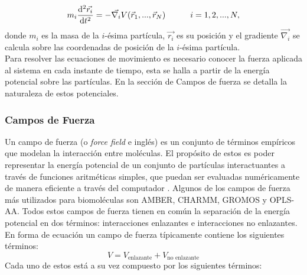 \begin{equation}\label{eq:1}
m_i\frac{\mathrm{d}^2\vec{r_i}}{\mathrm{d}t^2}=-\vec{\nabla_i}V(\vec{r}_1,...,\vec{r}_N) \text{\hspace{30pt}}i=1,2,...,N,
\end{equation}
donde $m_i$ es la masa de la $i$-\'{e}sima part\'{i}cula, $\vec{r_i}$ es su posici\'{o}n y el gradiente $ \vec{\nabla_i}$ se calcula sobre las coordenadas de posici\'{o}n de la $i$-\'{e}sima part\'{i}cula.\\

Para resolver las ecuaciones de movimiento es necesario conocer la fuerza aplicada al sistema en cada instante de tiempo, esta se halla a partir de la energ\'{i}a potencial sobre las part\'{i}culas. En la secci\'{o}n de Campos de fuerza se detalla la naturaleza de estos potenciales.
\subsubsection{Campos de Fuerza}
Un campo de fuerza (o \textit{force field} e ingl\'{e}s) es un conjunto de t\'{e}rminos emp\'{i}ricos que modelan la interacci\'{o}n entre mol\'{e}culas. El prop\'{o}sito de estos es poder representar la energ\'{i}a potencial de un conjunto de part\'{i}culas interactuantes a trav\'{e}s de funciones aritm\'{e}ticas simples, que puedan ser evaluadas num\'{e}ricamente de manera eficiente a trav\'{e}s del computador \cite{Kukol2014MolecularEdition}. Algunos de los campos de fuerza m\'{a}s utilizados para biomol\'{e}culas son AMBER, CHARMM, GROMOS y OPLS-AA. Todos estos campos de fuerza tienen en com\'{u}n la separaci\'{o}n de la energ\'{i}a potencial en dos t\'{e}rminos: interacciones enlazantes e interacciones no enlazantes. En forma de ecuaci\'{o}n un campo de fuerza t\'{i}picamente contiene los siguientes t\'{e}rminos:
\begin{equation}\label{eq:5}
    V=V_{\text{enlazante}}+V_{\text{no enlazante}}
\end{equation}
Cada uno de estos est\'{a} a su vez compuesto por los siguientes t\'{e}rminos:

